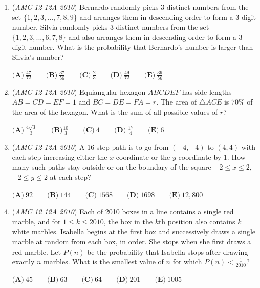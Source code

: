 \begin{enumerate}
 $\textbf{(A)}\ \frac{\sqrt{15}-3}{6} \qquad \textbf{(B)}\ \frac{6-\sqrt{6\sqrt{6}+2}}{12} \qquad \textbf{(C)}\ \frac{\sqrt{2}-1}{2} \qquad \textbf{(D)}\ \frac{3-\sqrt{3}}{6} \qquad \textbf{(E)}\ \frac{\sqrt{3}-1}{2}$


	\item (\textit{AMC 12 12A 2010}) Bernardo randomly picks 3 distinct numbers from the set $\{1,2,3,...,7,8,9\}$ and arranges them in descending order to form a 3-digit number. Silvia randomly picks 3 distinct numbers from the set $\{1,2,3,...,6,7,8\}$ and also arranges them in descending order to form a 3-digit number. What is the probability that Bernardo's number is larger than Silvia's number?


 $\textbf{(A)}\ \frac{47}{72} \qquad \textbf{(B)}\ \frac{37}{56} \qquad \textbf{(C)}\ \frac{2}{3} \qquad \textbf{(D)}\ \frac{49}{72} \qquad \textbf{(E)}\ \frac{39}{56}$


	\item (\textit{AMC 12 12A 2010}) Equiangular hexagon $ABCDEF$ has side lengths $AB=CD=EF=1$ and $BC=DE=FA=r$. The area of $\triangle ACE$ is $70\%$ of the area of the hexagon. What is the sum of all possible values of $r$?


 $\textbf{(A)}\ \frac{4\sqrt{3}}{3} \qquad \textbf{(B)} \frac{10}{3} \qquad \textbf{(C)}\ 4 \qquad \textbf{(D)}\ \frac{17}{4} \qquad \textbf{(E)}\ 6$


	\item (\textit{AMC 12 12A 2010}) A 16-step path is to go from $(-4,-4)$ to $(4,4)$ with each step increasing either the $x$-coordinate or the $y$-coordinate by 1. How many such paths stay outside or on the boundary of the square $-2 \le x \le 2$, $-2 \le y \le 2$ at each step?


 $\textbf{(A)}\ 92 \qquad \textbf{(B)}\ 144 \qquad \textbf{(C)}\ 1568 \qquad \textbf{(D)}\ 1698 \qquad \textbf{(E)}\ 12,800$


	\item (\textit{AMC 12 12A 2010}) Each of 2010 boxes in a line contains a single red marble, and for $1 \le k \le 2010$, the box in the $k\text{th}$ position also contains $k$ white marbles. Isabella begins at the first box and successively draws a single marble at random from each box, in order. She stops when she first draws a red marble. Let $P(n)$ be the probability that Isabella stops after drawing exactly $n$ marbles. What is the smallest value of $n$ for which $P(n) < \frac{1}{2010}$?


 $\textbf{(A)}\ 45 \qquad \textbf{(B)}\ 63 \qquad \textbf{(C)}\ 64 \qquad \textbf{(D)}\ 201 \qquad \textbf{(E)}\ 1005$



\end{enumerate}
